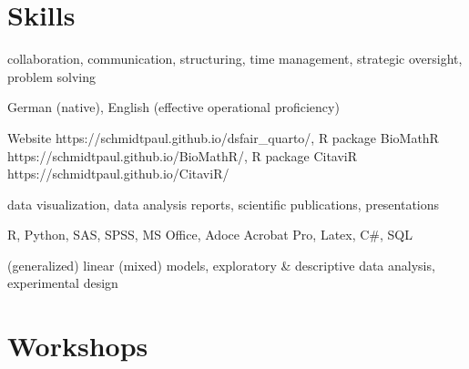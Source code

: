 \documentclass[11pt,a4paper,]{awesome-cv}
\begin{document}
\hypertarget{skills}{%
\section{Skills}\label{skills}}

\begin{cvskills} 
{collaboration, communication, structuring, time management, strategic oversight, problem solving } 

{German (native), English (effective operational proficiency) } 

{Website https://schmidtpaul.github.io/dsfair\_quarto/, R package BioMathR https://schmidtpaul.github.io/BioMathR/, R package CitaviR https://schmidtpaul.github.io/CitaviR/ } 

{data visualization, data analysis reports, scientific publications, presentations } 

{R, Python, SAS, SPSS, MS Office, Adoce Acrobat Pro, Latex, C\#, SQL } 

{(generalized) linear (mixed) models, exploratory \& descriptive data analysis, experimental design } 
\end{cvskills}

\hypertarget{workshops}{%
\section{Workshops}\label{workshops}}
\end{document}
